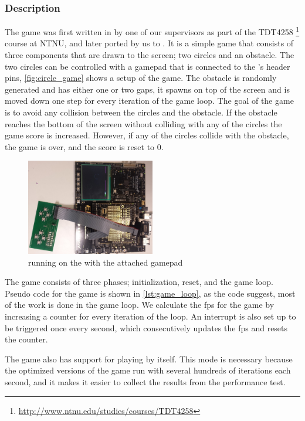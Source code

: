 \subsubsection{Description}

The game was first written in {\C} by one of our supervisors as part of the TDT4258 \footnote{\url{http://www.ntnu.edu/studies/courses/TDT4258}} course at NTNU, and later ported by us to {\rust}.
It is a simple game that consists of three components that are drawn to the screen; two circles and an obstacle.
The two circles can be controlled with a gamepad that is connected to the {\DK}'s header pins, \autoref{fig:circle_game} shows a setup of the game.
The obstacle is randomly generated and has either one or two gaps, it spawns on top of the screen and is moved down one step for every iteration of the game loop.
The goal of the game is to avoid any collision between the circles and the obstacle.
If the obstacle reaches the bottom of the screen without colliding with any of the circles the game score is increased.
However, if any of the circles collide with the obstacle, the game is over, and the score is reset to 0.

\begin{figure}[ht]
  \centering
  \includegraphics[width=0.5\textwidth]{figures/circle-game.jpg}
  \caption{{\cg} running on the {\DK} with the attached gamepad}
  \label{fig:circle_game}
\end{figure}

The game consists of three phases; initialization, reset, and the game loop.
Pseudo code for the game is shown in \autoref{lst:game_loop}, as the code suggest, most of the work is done in the game loop.
We calculate the \gls{fps} for the game by increasing a counter for every iteration of the loop.
An interrupt is also set up to be triggered once every second, which consecutively updates the \gls{fps} and resets the counter.

The game also has support for playing by itself.
This mode is necessary because the optimized versions of the game run with several hundreds of iterations each second, and it makes it easier to collect the results from the performance test.

